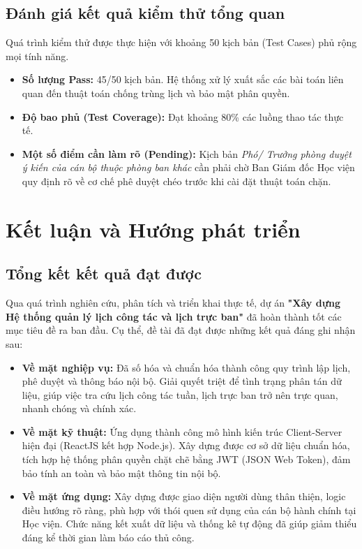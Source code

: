 \documentclass[18pt,a4paper]{report}
\begin{document}
\section{Đánh giá kết quả kiểm thử tổng quan}
Quá trình kiểm thử được thực hiện với khoảng 50 kịch bản (Test Cases) phủ rộng mọi tính năng.
\begin{itemize}[leftmargin=1.2cm]
    \item \textbf{Số lượng Pass:} 45/50 kịch bản. Hệ thống xử lý xuất sắc các bài toán liên quan đến thuật toán chống trùng lịch và bảo mật phân quyền.
    \item \textbf{Độ bao phủ (Test Coverage):} Đạt khoảng 80\% các luồng thao tác thực tế.
    \item \textbf{Một số điểm cần làm rõ (Pending):} Kịch bản \textit{Phó/ Trưởng phòng duyệt ý kiến của cán bộ thuộc phòng ban khác} cần phải chờ Ban Giám đốc Học viện quy định rõ về cơ chế phê duyệt chéo trước khi cài đặt thuật toán chặn.
\end{itemize}

\chapter{Kết luận và Hướng phát triển}

\section{Tổng kết kết quả đạt được}
Qua quá trình nghiên cứu, phân tích và triển khai thực tế, dự án \textbf{"Xây dựng Hệ thống quản lý lịch công tác và lịch trực ban"} đã hoàn thành tốt các mục tiêu đề ra ban đầu. Cụ thể, đề tài đã đạt được những kết quả đáng ghi nhận sau:

\begin{itemize}[leftmargin=1.2cm]
    \item \textbf{Về mặt nghiệp vụ:} Đã số hóa và chuẩn hóa thành công quy trình lập lịch, phê duyệt và thông báo nội bộ. Giải quyết triệt để tình trạng phân tán dữ liệu, giúp việc tra cứu lịch công tác tuần, lịch trực ban trở nên trực quan, nhanh chóng và chính xác.
    \item \textbf{Về mặt kỹ thuật:} Ứng dụng thành công mô hình kiến trúc Client-Server hiện đại (ReactJS kết hợp Node.js). Xây dựng được cơ sở dữ liệu chuẩn hóa, tích hợp hệ thống phân quyền chặt chẽ bằng JWT (JSON Web Token), đảm bảo tính an toàn và bảo mật thông tin nội bộ.
    \item \textbf{Về mặt ứng dụng:} Xây dựng được giao diện người dùng thân thiện, logic điều hướng rõ ràng, phù hợp với thói quen sử dụng của cán bộ hành chính tại Học viện. Chức năng kết xuất dữ liệu và thống kê tự động đã giúp giảm thiểu đáng kể thời gian làm báo cáo thủ công.
\end{itemize}
\end{document}
